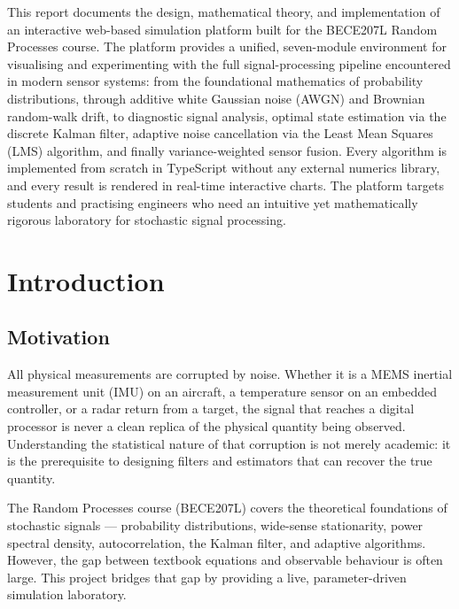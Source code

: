 \documentclass[12pt, a4paper]{article}
\begin{document}
\begin{tcolorbox}[colback=primary!5!white, colframe=primary, title=\textbf{Abstract}]
  This report documents the design, mathematical theory, and implementation of an
  interactive web-based simulation platform built for the BECE207L Random Processes
  course. The platform provides a unified, seven-module environment for visualising and
  experimenting with the full signal-processing pipeline encountered in modern sensor
  systems: from the foundational mathematics of probability distributions, through
  additive white Gaussian noise (AWGN) and Brownian random-walk drift, to diagnostic
  signal analysis, optimal state estimation via the discrete Kalman filter, adaptive
  noise cancellation via the Least Mean Squares (LMS) algorithm, and finally
  variance-weighted sensor fusion. Every algorithm is implemented from scratch in
  TypeScript without any external numerics library, and every result is rendered in
  real-time interactive charts. The platform targets students and practising engineers
  who need an intuitive yet mathematically rigorous laboratory for stochastic signal
  processing.
\end{tcolorbox}

\vspace{1em}

\section{Introduction}

\subsection{Motivation}

All physical measurements are corrupted by noise. Whether it is a MEMS inertial
measurement unit (IMU) on an aircraft, a temperature sensor on an embedded controller,
or a radar return from a target, the signal that reaches a digital processor is never a
clean replica of the physical quantity being observed.  Understanding the statistical
nature of that corruption is not merely academic: it is the prerequisite to designing
filters and estimators that can recover the true quantity.

The Random Processes course (BECE207L) covers the theoretical foundations of stochastic
signals --- probability distributions, wide-sense stationarity, power spectral density,
autocorrelation, the Kalman filter, and adaptive algorithms. However, the gap between
textbook equations and observable behaviour is often large. This project bridges that
gap by providing a live, parameter-driven simulation laboratory.
\end{document}
